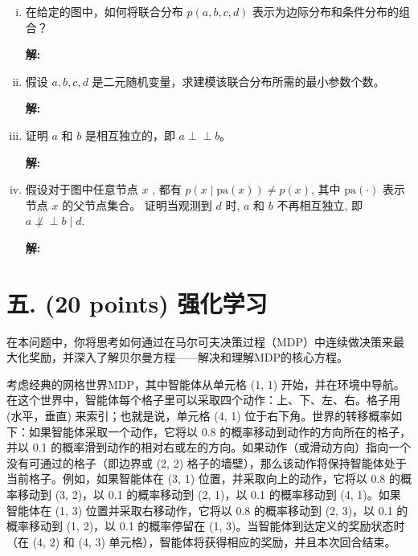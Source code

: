 \documentclass[8pt]{article}
\begin{document}
    \begin{enumerate}[(i)]
        \item 

        在给定的图中，如何将联合分布 $p(a, b, c, d)$ 表示为边际分布和条件分布的组合？
        
        \textbf{\large 解:}
        \vspace{1em}

        \item 

        假设 $a, b, c, d$ 是二元随机变量，求建模该联合分布所需的最小参数个数。
        
        \textbf{\large 解:}
        \vspace{1em}

        \item 
        
        证明 $a$ 和 $b$ 是相互独立的，即 \(a \perp\!\!\!\perp b\)。
        
        \textbf{\large 解:}
        \vspace{1em}


        \item 
        假设对于图中任意节点 $x$ , 都有 $p(x \mid \text{pa}(x)) \neq p(x)$, 其中 $\text{pa}(\cdot)$ 表示节点 $x$ 的父节点集合。
        证明当观测到 $d$ 时, $a$ 和 $b$ 不再相互独立, 即 \(a \not\perp\!\!\!\perp b \mid d\). 
        
        \textbf{\large 解:}
        \vspace{1em}

    \end{enumerate}

\newpage
\section*{五. (20 points) 强化学习}

在本问题中，你将思考如何通过在马尔可夫决策过程（MDP）中连续做决策来最大化奖励，并深入了解贝尔曼方程——解决和理解MDP的核心方程。

考虑经典的网格世界MDP，其中智能体从单元格 (1, 1) 开始，并在环境中导航。在这个世界中，智能体每个格子里可以采取四个动作：上、下、左、右。格子用 (水平，垂直) 来索引；也就是说，单元格 (4, 1) 位于右下角。世界的转移概率如下：如果智能体采取一个动作，它将以 0.8 的概率移动到动作的方向所在的格子，并以 0.1 的概率滑到动作的相对右或左的方向。如果动作（或滑动方向）指向一个没有可通过的格子（即边界或 (2, 2) 格子的墙壁），那么该动作将保持智能体处于当前格子。例如，如果智能体在 (3, 1) 位置，并采取向上的动作，它将以 0.8 的概率移动到 (3, 2)，以 0.1 的概率移动到 (2, 1)，以 0.1 的概率移动到 (4, 1)。如果智能体在 (1, 3) 位置并采取右移动作，它将以 0.8 的概率移动到 (2, 3)，以 0.1 的概率移动到 (1, 2)，以 0.1 的概率停留在 (1, 3)。当智能体到达定义的奖励状态时（在 (4, 2) 和 (4, 3) 单元格），智能体将获得相应的奖励，并且本次回合结束。
\end{document}

